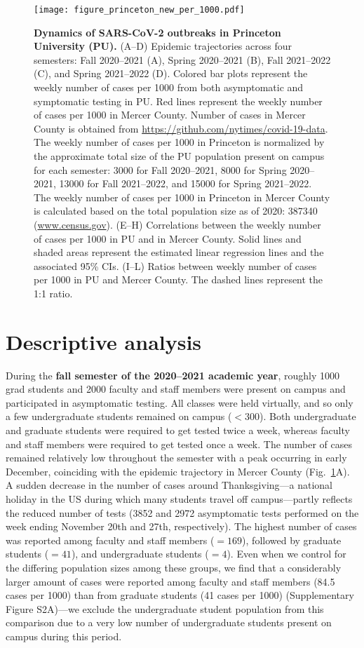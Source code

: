\documentclass[12pt]{article}
\newcommand{\fref}[1]{Fig.~\ref{fig:#1}}
\begin{document}
\begin{figure}[!th]
\texttt{[image: figure\_princeton\_new\_per\_1000.pdf]}
\caption{
\textbf{Dynamics of SARS-CoV-2 outbreaks in Princeton University (PU).}
(A--D) Epidemic trajectories across four semesters: Fall 2020--2021 (A), Spring 2020--2021 (B), Fall 2021--2022 (C), and Spring 2021--2022 (D).
Colored bar plots represent the weekly number of cases per 1000 from both asymptomatic and symptomatic testing in PU.
Red lines represent the weekly number of cases per 1000 in Mercer County.
Number of cases in Mercer County is obtained from \url{https://github.com/nytimes/covid-19-data}.
The weekly number of cases per 1000 in Princeton is normalized by the approximate total size of the PU population present on campus for each semester: 3000 for Fall 2020--2021, 8000 for Spring 2020--2021, 13000 for Fall 2021--2022, and 15000 for Spring 2021--2022.
The weekly number of cases per 1000 in Princeton in Mercer County is calculated based on the total population size as of 2020: 387340 (\url{www.census.gov}).
(E--H) Correlations between the weekly number of cases per 1000 in PU and in Mercer County.
Solid lines and shaded areas represent the estimated linear regression lines and the associated 95\% CIs.
(I--L) Ratios between weekly number of cases per 1000 in PU and Mercer County.
The dashed lines represent the 1:1 ratio.
\label{fig:princeton}
}
\end{figure}

\section*{Descriptive analysis}

During the \textbf{fall semester of the 2020--2021 academic year}, roughly 1000 grad students and 2000 faculty and staff members were present on campus and participated in asymptomatic testing. 
All classes were held virtually, and so only a few undergraduate students remained on campus ($<300$).  
Both undergraduate and graduate students were required to get tested twice a week, whereas faculty and staff members were required to get tested once a week.
The number of cases remained relatively low throughout the semester with a peak occurring in early December, coinciding with the epidemic trajectory in Mercer County (\fref{princeton}A).  
A sudden decrease in the number of cases around Thanksgiving---a national holiday in the US during which many students travel off campus---partly reflects the reduced number of tests (3852 and 2972 asymptomatic tests performed on the week ending November 20th and 27th, respectively).
The highest number of cases was reported among faculty and staff members ($=169$), followed by graduate students ($=41$), and undergraduate students ($=4$).
Even when we control for the differing population sizes among these groups, we find that a considerably larger amount of cases were reported among faculty and staff members (84.5 cases per 1000) than from graduate students (41 cases per 1000) (Supplementary Figure S2A)---we exclude the undergraduate student population from this comparison due to a very low number of undergraduate students present on campus during this period.
\end{document}
